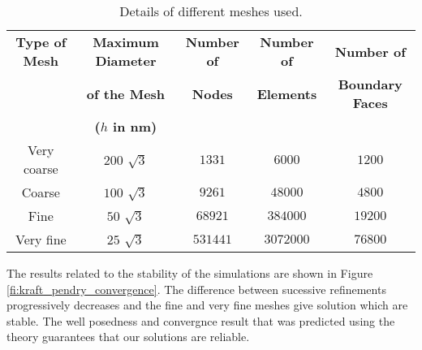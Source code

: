 \begin{table}[H]
  \centering
  
  \begin{tabular}{|c| c| c |c |c |}
    \toprule
   \textbf{ Type of Mesh }%
    & \textbf{Maximum Diameter} %
    & \textbf{Number of} %
    &\textbf{ Number of} %
    & \textbf{Number of}\\%
    & \textbf{of the Mesh } %
    & \textbf{Nodes}%
    &\textbf{ Elements} %
    & \textbf{Boundary Faces} \\ %
    & \textbf{($h$ in nm)} %
    &  %
    &  %
    & \\ %
    \midrule
    Very coarse%
    & $200$ $\sqrt{3}$ %
    & $1331$  %
    & $6000$ %
    & $1200$ \\ %
    Coarse %
    & $100$ $\sqrt{3}$%
    & $9261$ %
    & $48000$ %
    & $4800$\\ %
    Fine %
    & $50$ $\sqrt{3}$ %
    & $68921$ %
    & $384000$ %
    & $19200$ \\%
     Very fine %
    & $25$ $\sqrt{3}$%
    & $531441$%
    & $3072000$ %
    & $76800$  \\%
    \bottomrule
  \end{tabular}
  \caption{Details of different meshes used.}
  \label{ta:details_about_meshes}
\end{table}
%
The results related to the stability of the simulations are shown in Figure \ref{fi:kraft_pendry_convergence}.
The difference between sucessive refinements progressively decreases 
and the fine and very fine meshes give solution which are stable.
The well posedness and convergnce result that was predicted 
using the theory guarantees that our solutions are reliable.
  
